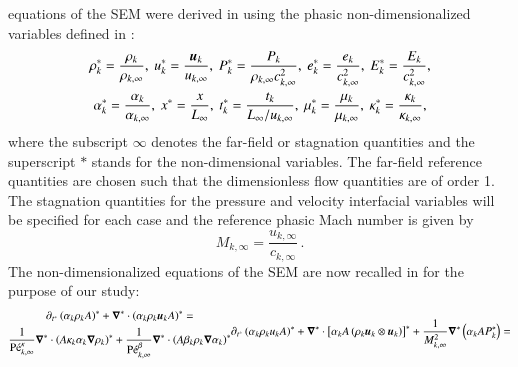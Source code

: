\documentclass[preprint,10pt]{elsarticle}
\begin{document}
\begin{enumerate}
equations of the SEM were derived in \cite{Marco_paper_sem} using the phasic non-dimensionalized variables defined in :
%
\begin{multline}
\label{eq:norm_param}
\rho_k^*   = \frac{\rho_k}{\rho_{k,\infty}}           ,\
u_k^*      = \frac{\boldsymbol u_k}{u_{k,\infty}}                 ,\
P_k^*      = \frac{P_k}{\rho_{k,\infty} c^2_{k,\infty}}   ,\
e_k^*      = \frac{e_k}{c^2_{k,\infty} }              , \
E_k^*      = \frac{E_k}{c^2_{k,\infty} }              , \\
\alpha_k^*      = \frac{\alpha_k}{\alpha_{k,\infty} }              , \
x^* = \frac{x}{L_\infty}                      ,\
t_k^* = \frac{t_k}{L_\infty / u_{k,\infty}}           ,\
\mu_k^*    = \frac{\mu_k}{\mu_{k,\infty}}             ,\
\kappa_k^* = \frac{\kappa_k}{\kappa_{k,\infty}}       ,
\end{multline}
%
where  the subscript $\infty$ denotes the far-field or stagnation quantities and the superscript $*$ stands for the non-dimensional variables.
The far-field reference quantities are chosen such that the dimensionless flow quantities are of order 1. The stagnation quantities for 
the pressure and velocity interfacial variables will be specified for each case and the reference phasic Mach number is given by
%
\begin{equation}
M_{k,\infty} = \frac{u_{k,\infty}}{c_{k,\infty}} \,.
\end{equation}
%
The non-dimensionalized equations of the SEM are now recalled in \eqt{eq:sev_equ_case_one_scaled} for the purpose of our study:
% 
\begin{subequations}\label{eq:sev_equ_case_one_scaled}
%
\begin{multline}\label{eq:sev_equ-with-diss-terms-cont_case_one_scaled}
\partial_{t^*} \left( \alpha_k \rho_k A \right)^* + \grad^* \cdot \left( \alpha_k \rho_k \mbold u_k A \right)^* = \\ \frac{1}{\Pe^\kappa_{k,\infty}}\grad^* \cdot \left(A 
\kappa_k \alpha_k \grad \rho_k \right)^* +
\frac{1}{\Pe_{k,\infty}^\beta} \grad^* \cdot \left( A \beta_k \rho_k \grad \alpha_k \right)^*
\end{multline}
%
\begin{multline}\label{eq:sev_equ-with-diss-terms-mom_case_one_scaled}
\partial_{t^*} \left( \alpha_k \rho_k u_k A \right)^* + \grad^* \cdot \left[ \alpha_k A \left( \rho_k \mbold u_k \otimes \mbold u_k\right)\right]^* + \frac{1}{M^2_{k,
\infty}}\grad^* \left( \alpha_k A P_k^* \right) = \\

\end{multline}
\end{subequations}
\end{enumerate}
\end{document}
